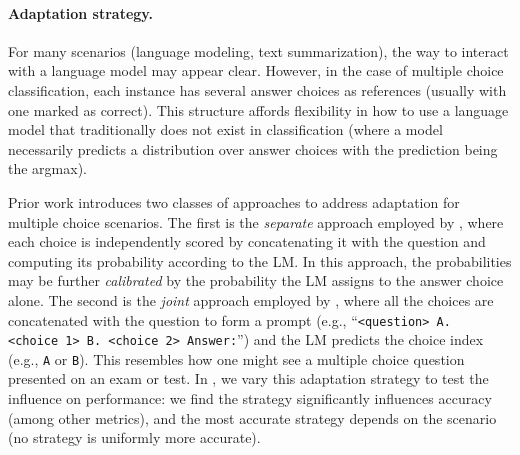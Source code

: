 \paragraph{Adaptation strategy.}
For many scenarios (\eg language modeling, text summarization), the way to interact with a language model may appear clear. 
However, in the case of multiple choice classification, each instance has several answer choices as references (usually with one marked as correct).
This structure affords flexibility in how to use a language model that traditionally does not exist in classification (where a model necessarily predicts a distribution over answer choices with the prediction being the argmax).

Prior work introduces two classes of approaches to address adaptation for multiple choice scenarios.
The first is the \textit{separate} approach employed by \citet{brown2020gpt3}, where each choice is independently scored by concatenating it with the question and computing its probability according to the LM.
In this approach, the probabilities may be further \textit{calibrated} by the probability the LM assigns to the answer choice alone.
The second is the \textit{joint} approach employed by \citet{hendrycks2021measuring}, where all the choices are concatenated with the question to form a prompt (e.g., ``\texttt{<question> A.\,<choice\,1> B.\,<choice\,2>  Answer:}'') and the LM predicts the choice index (e.g., \texttt{A} or \texttt{B}).
This resembles how one might see a multiple choice question presented on an exam or test.
In , we vary this adaptation strategy to test the influence on performance: we find the strategy significantly influences accuracy (among other metrics), and the most accurate strategy depends on the scenario (\ie no strategy is uniformly more accurate). 